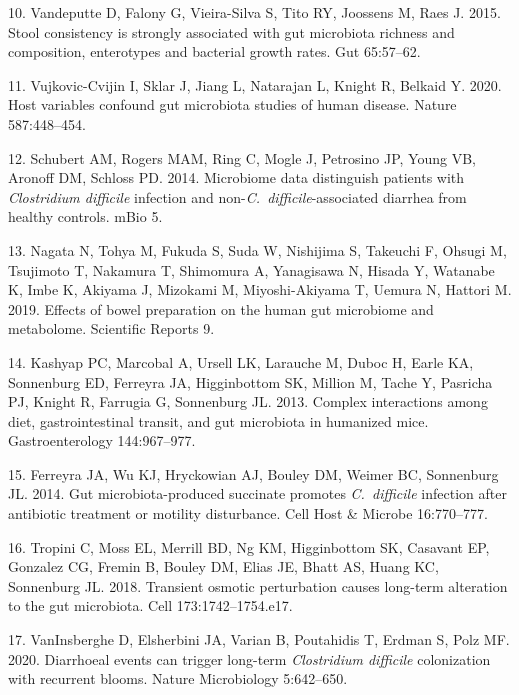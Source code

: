 \documentclass[
  11pt,
]{article}
\begin{document}
\leavevmode\hypertarget{ref-Vandeputte2015}{}%
10. Vandeputte D, Falony G, Vieira-Silva S, Tito RY, Joossens M, Raes J.
2015. Stool consistency is strongly associated with gut microbiota
richness and composition, enterotypes and bacterial growth rates. Gut
65:57--62.

\leavevmode\hypertarget{ref-VujkovicCvijin2020}{}%
11. Vujkovic-Cvijin I, Sklar J, Jiang L, Natarajan L, Knight R, Belkaid
Y. 2020. Host variables confound gut microbiota studies of human
disease. Nature 587:448--454.

\leavevmode\hypertarget{ref-Schubert2014}{}%
12. Schubert AM, Rogers MAM, Ring C, Mogle J, Petrosino JP, Young VB,
Aronoff DM, Schloss PD. 2014. Microbiome data distinguish patients with
\emph{Clostridium difficile} infection and
non-\emph{C.~difficile}-associated diarrhea from healthy controls. mBio
5.

\leavevmode\hypertarget{ref-Nagata2019}{}%
13. Nagata N, Tohya M, Fukuda S, Suda W, Nishijima S, Takeuchi F, Ohsugi
M, Tsujimoto T, Nakamura T, Shimomura A, Yanagisawa N, Hisada Y,
Watanabe K, Imbe K, Akiyama J, Mizokami M, Miyoshi-Akiyama T, Uemura N,
Hattori M. 2019. Effects of bowel preparation on the human gut
microbiome and metabolome. Scientific Reports 9.

\leavevmode\hypertarget{ref-Kashyap2013}{}%
14. Kashyap PC, Marcobal A, Ursell LK, Larauche M, Duboc H, Earle KA,
Sonnenburg ED, Ferreyra JA, Higginbottom SK, Million M, Tache Y,
Pasricha PJ, Knight R, Farrugia G, Sonnenburg JL. 2013. Complex
interactions among diet, gastrointestinal transit, and gut microbiota in
humanized mice. Gastroenterology 144:967--977.

\leavevmode\hypertarget{ref-Ferreyra2014}{}%
15. Ferreyra JA, Wu KJ, Hryckowian AJ, Bouley DM, Weimer BC, Sonnenburg
JL. 2014. Gut microbiota-produced succinate promotes \emph{C.~difficile}
infection after antibiotic treatment or motility disturbance. Cell Host
\& Microbe 16:770--777.

\leavevmode\hypertarget{ref-Tropini2018}{}%
16. Tropini C, Moss EL, Merrill BD, Ng KM, Higginbottom SK, Casavant EP,
Gonzalez CG, Fremin B, Bouley DM, Elias JE, Bhatt AS, Huang KC,
Sonnenburg JL. 2018. Transient osmotic perturbation causes long-term
alteration to the gut microbiota. Cell 173:1742--1754.e17.

\leavevmode\hypertarget{ref-VanInsberghe2020}{}%
17. VanInsberghe D, Elsherbini JA, Varian B, Poutahidis T, Erdman S,
Polz MF. 2020. Diarrhoeal events can trigger long-term \emph{Clostridium
difficile} colonization with recurrent blooms. Nature Microbiology
5:642--650.
\end{document}
